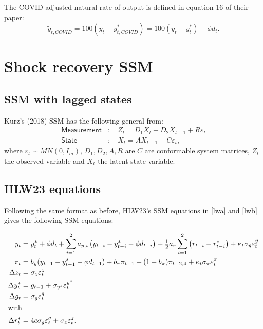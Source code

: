 \documentclass[a4paper,12pt]{article}
\newcommand{\bsq}{\begin{subequations}}\newcommand{\esq}{\end{subequations}}
\newcommand{\intxt}[1]{\intertext{#1}}\newcommand{\BAW}[1]{\begin{adjustwidth}{-#1mm}{-5mm}}\newcommand{\EAW}{\end{adjustwidth}}
\begin{document}
The COVID-adjusted natural rate of output is defined in equation 16 of their
paper: 
\begin{equation*}
\tilde{y}_{t,COVID}=100(y_{t}-y_{t,COVID}^{\ast })=100\left(
y_{t}-y_{t}^{\ast }\right) -\phi d_{t}.
\end{equation*}

\section{Shock recovery SSM}

\subsection{SSM with lagged states}

Kurz's (2018) SSM has the following general from:\bsq\label{SSM}%
\begin{align}
\mathsf{Measurement}& :\quad Z_{t}=D_{1}X_{t}+D_{2}X_{t-1}+R\varepsilon _{t}
\label{ssm1} \\
\mathsf{State}& :\quad X_{t}=AX_{t-1}+C\varepsilon _{t},  \label{ssm2}
\end{align}%
\esq where $\varepsilon _{t}\sim MN(0,I_{m})$, $D_{1},D_{2},A,R$ are $C$ are
conformable system matrices, $Z_{t}$ the observed variable and $X_{t}$ the
latent state variable.

\subsection{HLW23 equations}

Following the same format as before, HLW23's SSM equations in \ref{lwa} and %
\ref{lwb} gives the following SSM equations:

\bsq\label{LW03}%
\begin{align}
y_{t}& =y_{t}^{\ast }+\phi d_{t}+\sum_{i=1}^{2}a_{y,i}\left(
y_{t-i}-y_{t-i}^{\ast }-\phi d_{t-i}\right) +\tfrac{1}{2}a_{r}\sum_{i=1}^{2}%
\left( r_{t-i}-r_{t-i}^{\ast }\right) +\kappa _{t}\sigma _{\tilde{y}%
}\varepsilon _{t}^{\tilde{y}}  \label{LW03a} \\
\pi _{t}& =b_{y}(y_{t-1}-y_{t-1}^{\ast }-\phi d_{t-1})+b_{\pi }\pi
_{t-1}+(1-b_{\pi })\pi _{t-2,4}+\kappa _{t}\sigma _{\pi }\varepsilon
_{t}^{\pi } \\
\Delta z_{t}& =\sigma _{z}\varepsilon _{t}^{z}  \label{LW03c} \\
\Delta y_{t}^{\ast }& =g_{t-1}+\sigma _{y^{\ast }}\varepsilon _{t}^{y^{\ast
}}  \label{LW03d} \\
\Delta g_{t}& =\sigma _{g}\varepsilon _{t}^{g}  \label{LW03e} \\
\intxt{with}\Delta r_{t}^{\ast }& =4c\sigma _{g}\varepsilon _{t}^{g}+\sigma
_{z}\varepsilon _{t}^{z}.  \label{LW03f}
\end{align}%
\esq
\end{document}
